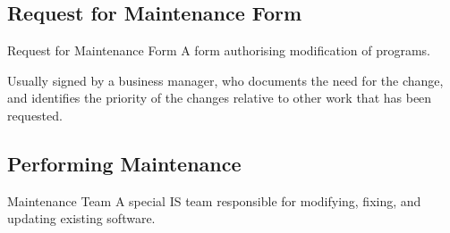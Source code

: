 \documentclass[\main/notes.tex]{subfiles}
\begin{document}
			\subsection{Request for Maintenance Form}
				\begin{definition}{Request for Maintenance Form}
					A form authorising modification of programs.

					Usually signed by a business manager, who documents the need for the change, and identifies the priority of the changes relative to other work that has been requested.
				\end{definition}
			\subsection{Performing Maintenance}
				\begin{definition}{Maintenance Team}
					A special IS team responsible for modifying, fixing, and updating existing software.
				\end{definition}
\end{document}
